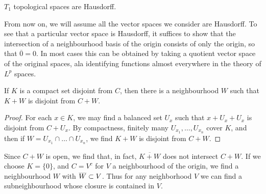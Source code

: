 \begin{corollary}
    $T_1$ topological spaces are Hausdorff.
\end{corollary}

From now on, we will assume all the vector spaces we consider are Hausdorff. To see that a particular vector space is Hausdorff, it suffices to show that the intersection of a neighbourhood basis of the origin consists of only the origin, so that $\overline{0} = 0$. In most cases this can be obtained by taking a quotient vector space of the original spaces, ala identifying functions almost everywhere in the theory of $L^p$ spaces.

\begin{corollary}
    If $K$ is a compact set disjoint from $C$, then there is a neighbourhood $W$ such that $K + W$ is disjoint from $C + W$.
\end{corollary}
\begin{proof}
    For each $x \in K$, we may find a balanced set $U_x$ such that $x + U_x + U_x$ is disjoint from $C + U_x$. By compactness, finitely many $U_{x_1}, \dots, U_{x_n}$ cover $K$, and then if $W = U_{x_1} \cap \dots \cap U_{x_n}$, we find $K + W$ is disjoint from $C + W$.
\end{proof}

Since $C + W$ is open, we find that, in fact, $\overline{K + W}$ does not intersect $C + W$. If we choose $K = \{ 0 \}$, and $C = V^c$ for $V$ a neighbourhood of the origin, we find a neighbourhood $W$ with $\smash{\overline{W}} \subset V$. Thus for any neighborhood $V$ we can find a subneighbourhood whose closure is contained in $V$.

